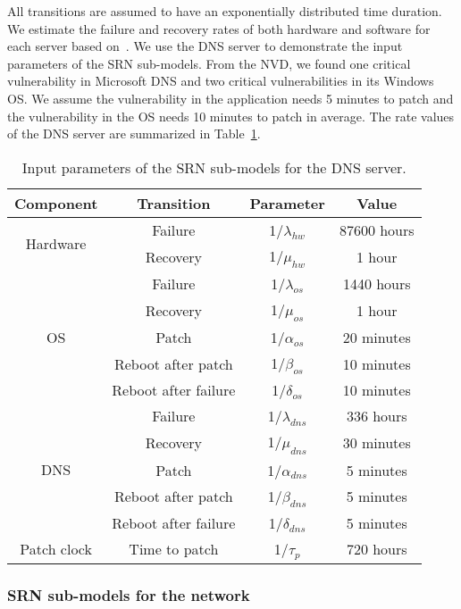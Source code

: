 \documentclass[conference]{IEEEtran}
\begin{document}
All transitions are assumed to have an exponentially distributed time duration. We estimate the failure and recovery rates of both hardware and software for each server based on~\cite{Kim2009PRDC}. We use the DNS server to demonstrate the input parameters of the SRN sub-models. From the NVD, we found one critical vulnerability in Microsoft DNS and two critical vulnerabilities in its Windows OS. We assume the vulnerability in the application needs 5 minutes to patch and the vulnerability in the OS needs 10 minutes to patch in average. The rate values of the DNS server are summarized in Table~\ref{tb_srn_input}.
\begin{table}[htb] \small
\caption{Input parameters of the SRN sub-models for the DNS server.}
\label{tb_srn_input}
\centering
\begin{tabular}{|c|c|c|c|}
\hline
Component & Transition & Parameter & Value\\
\hline
\multirow{2}{*}{Hardware} & Failure  & 1/$\lambda_{hw}$ & 87600 hours\\
\cline{2-4}
& Recovery & 1/$\mu_{hw}$ & 1 hour\\
\hline
\multirow{5}{*}{OS} & Failure  & 1/$\lambda_{os}$ & 1440 hours\\
\cline{2-4}
& Recovery & 1/$\mu_{os}$ & 1 hour\\
\cline{2-4}
& Patch & 1/$\alpha_{os}$ & 20 minutes\\
\cline{2-4}
& Reboot after patch & 1/$\beta_{os}$ & 10 minutes\\
\cline{2-4}
& Reboot after failure & 1/$\delta_{os}$ & 10 minutes\\
\hline
\multirow{5}{*}{DNS} & Failure & 1/$\lambda_{dns}$ & 336 hours\\
\cline{2-4}
& Recovery & 1/$\mu_{dns}$ & 30 minutes\\
\cline{2-4}
& Patch & 1/$\alpha_{dns}$ & 5 minutes\\
\cline{2-4}
& Reboot after patch & 1/$\beta_{dns}$ & 5 minutes\\
\cline{2-4}
& Reboot after failure & 1/$\delta_{dns}$ & 5 minutes\\
\hline
Patch clock & Time to patch & 1/$\tau_{p}$ & 720 hours\\
\hline
\end{tabular}
\end{table}

\subsubsection{SRN sub-models for the network}
\label{sub_network}
\end{document}
